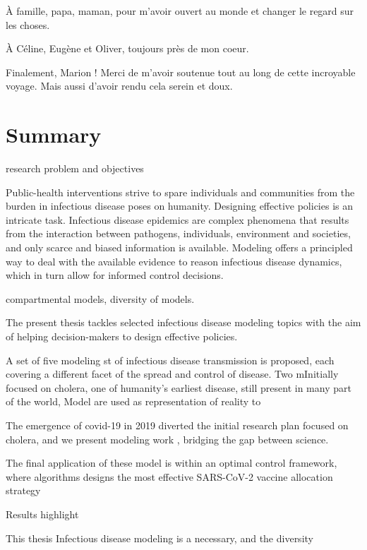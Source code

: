 À famille, papa, maman, pour m'avoir ouvert au monde et changer le regard sur les choses.

À Céline, Eugène et Oliver, toujours près de mon coeur.

Finalement, Marion ! Merci de m'avoir soutenue tout au long de cette incroyable voyage. Mais aussi d'avoir rendu cela serein et doux. 
 
 \chapter*{Summary} 
 research problem and objectives

Public-health interventions strive to spare individuals and communities from the burden in infectious disease poses on humanity. Designing effective policies is an intricate task. Infectious disease epidemics are complex phenomena that results from the interaction between pathogens, individuals, environment and societies, and only scarce and biased information is available.  Modeling offers a principled way to deal with the available evidence to reason infectious disease dynamics, which in turn allow for informed control decisions.



compartmental models, diversity of models.

The present thesis tackles selected infectious disease modeling topics with the aim of helping decision-makers to design effective policies. 

A set of five modeling st of infectious disease transmission is proposed, each covering a different facet of the spread and control of disease.
Two mInitially focused on cholera, one of humanity's earliest disease, still present in many part of the world,  Model are used as representation of reality to 

The emergence of covid-19 in 2019 diverted the initial research plan focused on cholera, and we present modeling work , bridging the gap between science.


The final application of these model is within an optimal control framework, where algorithms designs the most effective SARS-CoV-2 vaccine allocation strategy




Results highlight 


This thesis Infectious disease modeling is a necessary, and the diversity 
 
